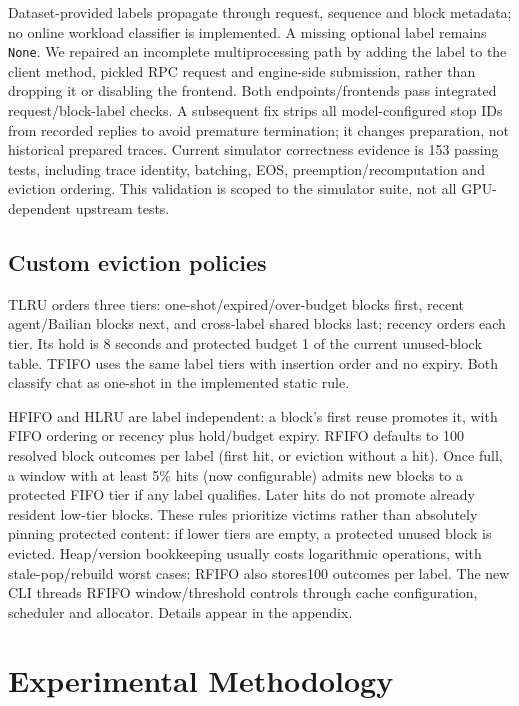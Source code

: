 \documentclass{article}
\begin{document}
Dataset-provided labels propagate through request, sequence and block metadata; no online workload classifier is implemented. A missing optional label remains \texttt{None}. We repaired an incomplete multiprocessing path by adding the label to the client method, pickled RPC request and engine-side submission, rather than dropping it or disabling the frontend. Both endpoints/frontends pass integrated request/block-label checks. A subsequent fix strips all model-configured stop IDs from recorded replies to avoid premature termination; it changes preparation, not historical prepared traces. Current simulator correctness evidence is 153 passing tests, including trace identity, batching, EOS, preemption/recomputation and eviction ordering. This validation is scoped to the simulator suite, not all GPU-dependent upstream tests.

\subsection{Custom eviction policies}
TLRU orders three tiers: one-shot/expired/over-budget blocks first, recent agent/Bailian blocks next, and cross-label shared blocks last; recency orders each tier. Its hold is 8 seconds and protected budget 1 of the current unused-block table. TFIFO uses the same label tiers with insertion order and no expiry. Both classify chat as one-shot in the implemented static rule.

HFIFO and HLRU are label independent: a block's first reuse promotes it, with FIFO ordering or recency plus hold/budget expiry. RFIFO defaults to 100 resolved block outcomes per label (first hit, or eviction without a hit). Once full, a window with at least 5\% hits (now configurable) admits new blocks to a protected FIFO tier if any label qualifies. Later hits do not promote already resident low-tier blocks. These rules prioritize victims rather than absolutely pinning protected content: if lower tiers are empty, a protected unused block is evicted. Heap/version bookkeeping usually costs logarithmic operations, with stale-pop/rebuild worst cases; RFIFO also stores100 outcomes per label. The new CLI threads RFIFO window/threshold controls through cache configuration, scheduler and allocator. Details appear in the appendix.

\section{Experimental Methodology}
\end{document}
